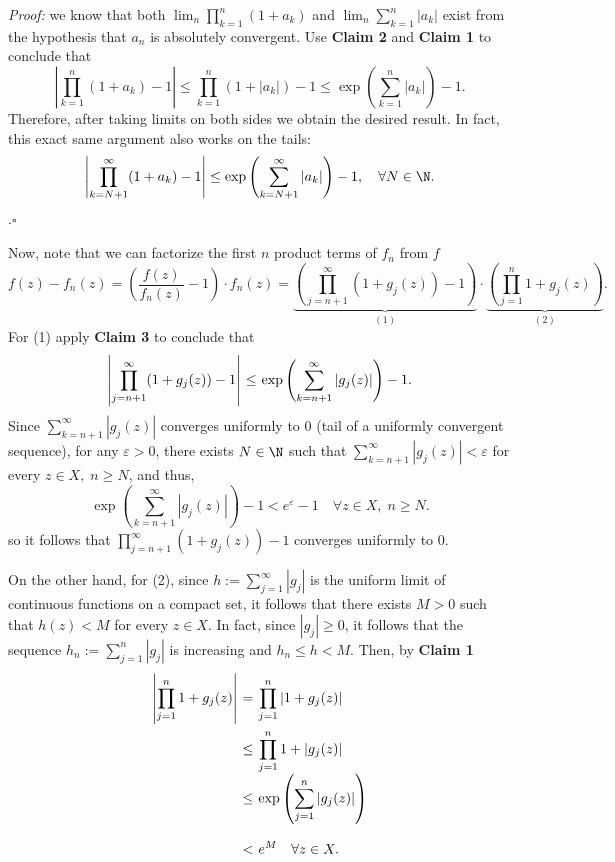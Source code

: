 \textit{Proof:} we know that both $\lim_n \prod_{k = 1}^{n} (1+a_k)$ and $\lim_n \sum_{k = 1}^{n}|a_k|$ exist from the hypothesis that $a_n$ is absolutely convergent. Use \textbf{Claim 2} and \textbf{Claim 1} to conclude that
\[ \left| \prod_{k = 1}^{n} (1+a_k) - 1 \right| \leq  \prod_{k = 1}^{n} (1+|a_k|) - 1 \leq \exp\left( \sum_{k = 1}^n |a_k|\right) - 1.\]
Therefore, after taking limits on both sides we obtain the desired result. In fact, this exact same argument also works on the tails:
\[ \left| \prod_{k = N+1}^{\infty} (1+a_k) - 1 \right| \leq \exp\left( \sum_{k = N+1}^{\infty} |a_k| \right) - 1,\quad \forall N \in \N. \]
.\hfill $\square$

Now, note that we can factorize the first $n$ product terms of $f_n$ from $f$ 
\[ f(z) - f_n(z) =  \left( \frac{f(z)}{f_n(z)} - 1 \right)\cdot f_n(z) = \underbrace{\left( \prod_{j = n+1}^{\infty} (1+g_j(z)) - 1 \right)}_{(1)} \cdot \underbrace{\left( \prod_{j = 1}^{n} 1+g_j(z) \right)}_{(2)}. \]
For (1) apply \textbf{Claim 3} to conclude that
\[ \everymath{\displaystyle}
\arraycolsep=1.8pt\def\arraystretch{2.5}
\begin{array}{rcl}
    \left| \prod_{j = n+1}^{\infty} (1+g_j(z)) - 1 \right| & \leq & \exp \left( \sum_{k = n+1}^{\infty} |g_j(z)| \right) - 1.
\end{array} \]
Since $\sum_{k = n+1}^{\infty} |g_j(z)|$ converges uniformly to 0 (tail of a uniformly convergent sequence), for any $\varepsilon > 0$, there exists $N \in \N$ such that $\sum_{k = n+1}^{\infty} |g_j(z)| < \varepsilon$ for every $z \in X,\; n \geq N$, and thus,
\[ \exp \left( \sum_{k = n+1}^{\infty} |g_j(z)| \right) - 1 < e^{\varepsilon} - 1 \quad \forall z \in X,\; n \geq N. \]
so it follows that $\prod_{j = n+1}^{\infty} (1+g_j(z)) - 1$ converges uniformly to 0.

On the other hand, for (2), since $h := \sum_{j = 1}^{\infty} |g_j|$ is the uniform limit of continuous functions on a compact set, it follows that there exists $M > 0$ such that $h(z) < M$ for every $z \in X$. In fact, since $|g_j| \geq 0$, it follows that the sequence $h_n := \sum_{j = 1}^n|g_j|$ is increasing and $h_n \leq h < M$. Then, by \textbf{Claim 1}
\[ \everymath{\displaystyle}
\arraycolsep=1.8pt\def\arraystretch{2.5}
\begin{array}{rcl}
    \left|\prod_{j = 1}^{n} 1+g_j(z) \right| & = & \prod_{j = 1}^{n} |1+g_j(z)|\\
    & \leq & \prod_{j = 1}^{n} 1+|g_j(z)|\\
    & \leq & \exp\left( \sum_{j = 1}^n |g_j(z)| \right)\\
    & < & e^M\quad \forall z \in X.
\end{array}\]


